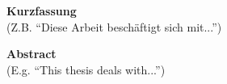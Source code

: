 %
%
% 
% 
% 



\cleardoublepage

{\Large\bfseries Kurzfassung\\}
(Z.B. ``Diese Arbeit beschäftigt sich mit...'')



\cleardoublepage

{\Large\bfseries Abstract\\}
(E.g. ``This thesis deals with...'')

